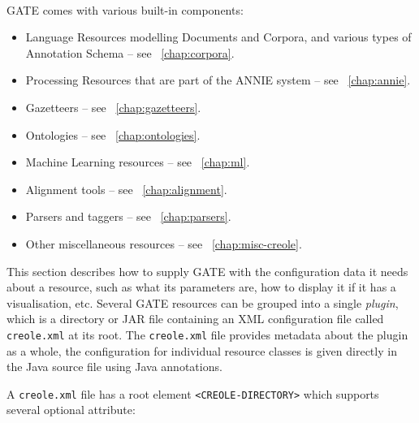 
\mbox{ }

GATE comes with various built-in components:
%
\begin{itemize}
%
\item
Language Resources modelling Documents and Corpora, and various types of
Annotation Schema -- see \Chapthing\ \ref{chap:corpora}.
%
\item
Processing Resources that are part of the ANNIE system -- see \Chapthing\
\ref{chap:annie}.
%
%
\item 
Gazetteers -- see \Chapthing\
\ref{chap:gazetteers}.
\item
Ontologies -- see \Chapthing\
\ref{chap:ontologies}.
\item
Machine Learning resources -- see \Chapthing\
\ref{chap:ml}.
\item
Alignment tools -- see \Chapthing\
\ref{chap:alignment}.
\item
Parsers and taggers -- see \Chapthing\
\ref{chap:parsers}.
\item
Other miscellaneous resources -- see \Chapthing\ \ref{chap:misc-creole}.
\end{itemize}


This section describes how to supply GATE with the configuration data it needs
about a resource, such as what its parameters are, how to display it if it has
a visualisation, etc.  Several GATE resources can be grouped into a single
\emph{plugin}, which is a directory or JAR file containing an XML configuration file called
{\tt creole.xml} at its root.  The {\tt creole.xml} file provides metadata
about the plugin as a whole, the configuration for individual resource classes
is given directly in the Java source file using Java annotations.

A {\tt creole.xml} file has a root element \verb|<CREOLE-DIRECTORY>| which
supports several optional attribute:


